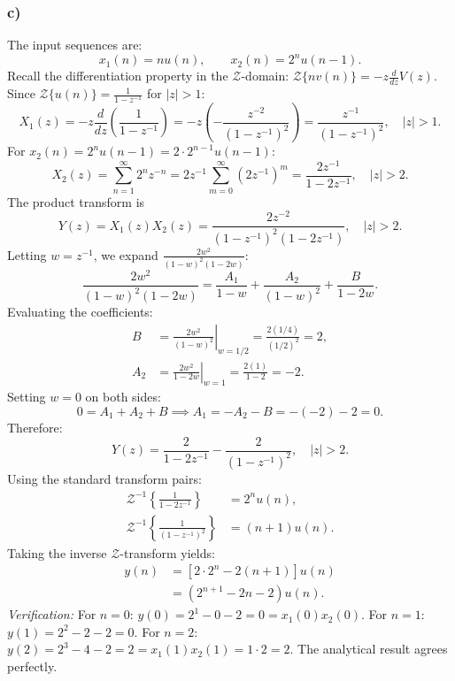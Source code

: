 \documentclass[12pt,a4paper]{article}
\begin{document}
\subsubsection*{c)}
The input sequences are:
\begin{equation*}
    x_1(n) = n u(n), \qquad x_2(n) = 2^n u(n-1).
\end{equation*}
Recall the differentiation property in the $\mathcal{Z}$-domain: $\mathcal{Z}\{n v(n)\} = -z \frac{d}{dz} V(z)$. Since $\mathcal{Z}\{u(n)\} = \frac{1}{1 - z^{-1}}$ for $|z| > 1$:
\begin{equation}
    X_1(z) = -z \frac{d}{dz}\left(\frac{1}{1 - z^{-1}}\right) = -z \left( -\frac{z^{-2}}{(1 - z^{-1})^2} \right) = \frac{z^{-1}}{(1 - z^{-1})^2}, \quad |z| > 1.
\end{equation}
For $x_2(n) = 2^n u(n-1) = 2 \cdot 2^{n-1} u(n-1)$:
\begin{equation}
    X_2(z) = \sum_{n=1}^{\infty} 2^n z^{-n} = 2z^{-1} \sum_{m=0}^{\infty} (2z^{-1})^m = \frac{2z^{-1}}{1 - 2z^{-1}}, \quad |z| > 2.
\end{equation}
The product transform is
\begin{equation}
    Y(z) = X_1(z) X_2(z) = \frac{2z^{-2}}{(1 - z^{-1})^2(1 - 2z^{-1})}, \quad |z| > 2.
\end{equation}
Letting $w = z^{-1}$, we expand $\frac{2w^2}{(1 - w)^2(1 - 2w)}$:
\begin{equation}
    \frac{2w^2}{(1 - w)^2(1 - 2w)} = \frac{A_1}{1 - w} + \frac{A_2}{(1 - w)^2} + \frac{B}{1 - 2w}.
\end{equation}
Evaluating the coefficients:
\begin{align*}
    B   &= \left. \frac{2w^2}{(1 - w)^2} \right|_{w = 1/2} = \frac{2(1/4)}{(1/2)^2} = 2, \\
    A_2 &= \left. \frac{2w^2}{1 - 2w} \right|_{w = 1} = \frac{2(1)}{1 - 2} = -2.
\end{align*}
Setting $w = 0$ on both sides:
\begin{equation*}
    0 = A_1 + A_2 + B \implies A_1 = -A_2 - B = -(-2) - 2 = 0.
\end{equation*}
Therefore:
\begin{equation}
    Y(z) = \frac{2}{1 - 2z^{-1}} - \frac{2}{(1 - z^{-1})^2}, \quad |z| > 2.
\end{equation}
Using the standard transform pairs:
\begin{align*}
    \mathcal{Z}^{-1}\left\{ \frac{1}{1 - 2z^{-1}} \right\} &= 2^n u(n), \\
    \mathcal{Z}^{-1}\left\{ \frac{1}{(1 - z^{-1})^2} \right\} &= (n+1)u(n).
\end{align*}
Taking the inverse $\mathcal{Z}$-transform yields:
\begin{align}
    y(n) &= \left[ 2 \cdot 2^n - 2(n+1) \right] u(n) \nonumber \\
         &= \left( 2^{n+1} - 2n - 2 \right) u(n).
\end{align}
\textit{Verification:} For $n=0$: $y(0) = 2^1 - 0 - 2 = 0 = x_1(0)x_2(0)$. For $n=1$: $y(1) = 2^2 - 2 - 2 = 0$. For $n=2$: $y(2) = 2^3 - 4 - 2 = 2 = x_1(1)x_2(1) = 1 \cdot 2 = 2$. The analytical result agrees perfectly.
\end{document}

